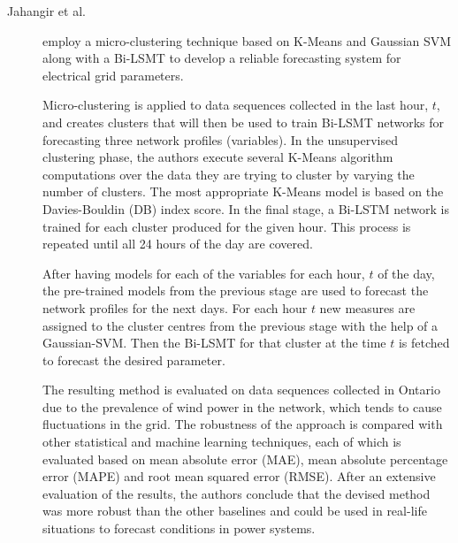 \begin{description}
    \item[Jahangir et al.]\cite{Jahangir.Tayarani.ea_DeepLearningBasedForecasting_2021} employ a micro-clustering technique based on K-Means and Gaussian SVM along with a Bi-LSMT to develop a reliable forecasting system for electrical grid parameters. 
    
    Micro-clustering is applied to data sequences collected in the last hour, $t$, and creates clusters that will then be used to train Bi-LSMT networks for forecasting three network profiles (variables). In the unsupervised clustering phase, the authors execute several K-Means algorithm computations over the data they are trying to cluster by varying the number of clusters. The most appropriate K-Means model is based on the Davies-Bouldin (DB) index score. In the final stage, a Bi-LSTM network is trained for each cluster produced for the given hour. This process is repeated until all 24 hours of the day are covered.

    After having models for each of the variables for each hour, $t$ of the day, the pre-trained models from the previous stage are used to forecast the network profiles for the next days. For each hour $t$ new measures are assigned to the cluster centres from the previous stage with the help of a Gaussian-SVM. Then the Bi-LSMT for that cluster at the time $t$ is fetched to forecast the desired parameter. 

    The resulting method is evaluated on data sequences collected in Ontario due to the prevalence of wind power in the network, which tends to cause fluctuations in the grid. The robustness of the approach is compared with other statistical and machine learning techniques, each of which is evaluated based on mean absolute error (MAE), mean absolute percentage error (MAPE) and root mean squared error (RMSE). After an extensive evaluation of the results, the authors conclude that the devised method was more robust than the other baselines and could be used in real-life situations to forecast conditions in power systems.
\end{description}


